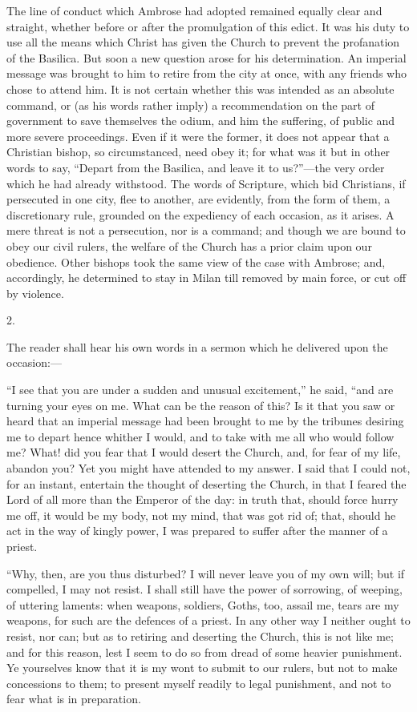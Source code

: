 The line of conduct which Ambrose had adopted remained
equally clear and straight, whether before or after the promulgation
of this edict. It was his duty to use all the means which Christ has
given the Church to prevent the profanation of the Basilica. But soon
a new question arose for his determination. An imperial message was
brought to him to retire from the city at once, with any friends who
chose to attend him. It is not certain whether this was intended as an
absolute command, or (as his words rather imply) a recommendation on
the part of government to save themselves the odium, and him the
suffering, of public and more severe proceedings. Even if it were the
former, it does not appear that a Christian bishop, so circumstanced,
need obey it; for what was it but in other words to say, ``Depart
from the Basilica, and leave it to us?''—the very order which he
had already withstood. The words of Scripture, which bid Christians,
if persecuted in one city, flee to another, are evidently, from the
form of them, a discretionary rule, grounded on the expediency of each
occasion, as it arises. A mere threat is not a persecution, nor is a
command; and though we are bound to obey our civil rulers, the welfare
of the Church has a prior claim upon our obedience. Other bishops took
the same view of the case with Ambrose; and, accordingly, he
determined to stay in Milan till removed by main force, or cut off by
violence.

2.

The reader shall hear his own words in a sermon which he delivered
upon the occasion:—

``I see that you are under a sudden and unusual
excitement,'' he said, ``and are turning your eyes on me. What
can be the reason of this? Is it that you saw or heard that an
imperial message had been brought to me by the tribunes desiring me to
depart hence whither I would, and to take with me all who would follow
me? What! did you fear that I would desert
the Church, and, for fear of my life, abandon you? Yet you might have
attended to my answer. I said that I could not, for an instant,
entertain the thought of deserting the Church, in that I feared the
Lord of all more than the Emperor of the day: in truth that, should
force hurry me off, it would be my body, not my mind, that was got rid
of; that, should he act in the way of kingly power, I was prepared to
suffer after the manner of a priest.

``Why, then, are you thus disturbed? I will never leave you of
my own will; but if compelled, I may not resist. I shall still have
the power of sorrowing, of weeping, of uttering laments: when weapons,
soldiers, Goths, too, assail me, tears are my weapons, for such are
the defences of a priest. In any other way I neither ought to resist,
nor can; but as to retiring and deserting the Church, this is not like
me; and for this reason, lest I seem to do so from dread of some
heavier punishment. Ye yourselves know that it is my wont to submit to
our rulers, but not to make concessions to them; to present myself
readily to legal punishment, and not to fear what is in preparation.

